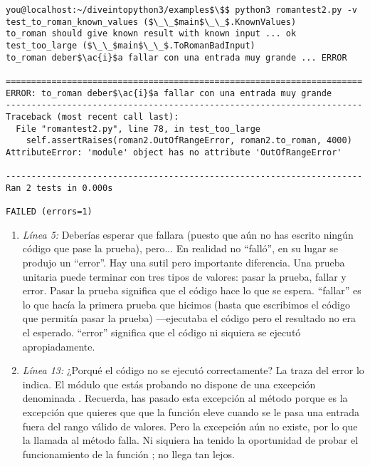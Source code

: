 \noindent\begin{minipage}{\textwidth}
\begin{lstlisting}[mathescape=True]
you@localhost:~/diveintopython3/examples$\$$ python3 romantest2.py -v
test_to_roman_known_values ($\_\_$main$\_\_$.KnownValues)
to_roman should give known result with known input ... ok
test_too_large ($\_\_$main$\_\_$.ToRomanBadInput)
to_roman deber$\ac{i}$a fallar con una entrada muy grande ... ERROR

======================================================================
ERROR: to_roman deber$\ac{i}$a fallar con una entrada muy grande
----------------------------------------------------------------------
Traceback (most recent call last):
  File "romantest2.py", line 78, in test_too_large
    self.assertRaises(roman2.OutOfRangeError, roman2.to_roman, 4000)
AttributeError: 'module' object has no attribute 'OutOfRangeError'

----------------------------------------------------------------------
Ran 2 tests in 0.000s

FAILED (errors=1)
\end{lstlisting}
\end{minipage}

\begin{enumerate}

\item \emph{Línea 5:} Deberías esperar que fallara (puesto que aún no has escrito ningún código que pase la prueba), pero... En realidad no ``falló'', en su lugar se produjo un ``error''. Hay una sutil pero importante diferencia. Una prueba unitaria puede terminar con tres tipos de valores: pasar la prueba, fallar y error. Pasar la prueba significa que el código hace lo que se espera. ``fallar'' es lo que hacía la primera prueba que hicimos (hasta que escribimos el código que permitía pasar la prueba) ---ejecutaba el código pero el resultado no era el esperado. ``error'' significa que el código ni siquiera se ejecutó apropiadamente.

\item \emph{Línea 13:} ¿Porqué el código no se ejecutó correctamente? La traza del error lo indica. El módulo que estás probando no dispone de una excepción denominada . Recuerda, has pasado esta excepción al método  porque es la excepción que quieres que que la función eleve cuando se le pasa una entrada fuera del rango válido de valores. Pero la excepción aún no existe, por lo que la llamada al método  falla. Ni siquiera ha tenido la oportunidad de probar el funcionamiento de la función ; no llega tan lejos.

\end{enumerate}

